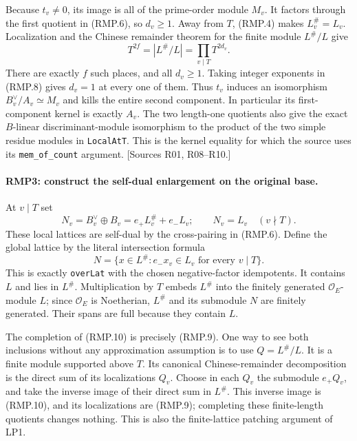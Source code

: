 Because $t_v\ne0$, its image is all of the prime-order module
$M_v$. It factors through the first quotient in (RMP.6), so $d_v\ge1$.
Away from $T$, (RMP.4) makes $L_v^{\#}=L_v$. Localization and the
Chinese remainder theorem for the finite module $L^{\#}/L$ give
\[
 T^{2f}=|L^{\#}/L|=\prod_{v\mid T}T^{2d_v}.
                                                               \tag{RMP.8}
\]
There are exactly $f$ such places, and all $d_v\ge1$. Taking
integer exponents in (RMP.8) gives $d_v=1$ at every one of them.
Thus $t_v$ induces an isomorphism
$B_v^{\vee}/A_v\simeq M_v$ and kills the entire second component.
In particular its first-component kernel is exactly $A_v$.
The two length-one quotients also give the exact $B$-linear
discriminant-module isomorphism to the product of the two simple
residue modules in \texttt{LocalAtT}.
This is the kernel equality for which the source uses its
\texttt{mem\_of\_count} argument. [Sources R01, R08--R10.]

\paragraph{RMP3: construct the self-dual enlargement on the original base.}
\label{claim:RMP3}
At $v\mid T$ set
\[
 N_v=B_v^{\vee}\oplus B_v
     =e_+L_v^{\#}+e_-L_v;
 \qquad N_v=L_v\quad(v\nmid T).                       \tag{RMP.9}
\]
These local lattices are self-dual by the cross-pairing in (RMP.6).
Define the global lattice by the literal intersection formula
\[
 N=\{x\in L^{\#}:e_-x_v\in L_v\text{ for every }v\mid T\}.
                                                               \tag{RMP.10}
\]
This is exactly \texttt{overLat} with the chosen negative-factor
idempotents. It contains $L$ and lies in $L^{\#}$. Multiplication by
$T$ embeds $L^{\#}$ into the finitely generated $\mathcal O_E$-module $L$;
since $\mathcal O_E$ is Noetherian, $L^{\#}$ and its submodule $N$
are finitely generated. Their spans are full because
they contain $L$.

The completion of (RMP.10) is precisely (RMP.9). One way to see both
inclusions without any approximation assumption is to use
$Q=L^{\#}/L$. It is a finite module supported above $T$.
Its canonical Chinese-remainder decomposition is the direct sum of
its localizations $Q_v$. Choose in each $Q_v$ the submodule
$e_+Q_v$, and take the inverse image of their direct sum in
$L^{\#}$. This inverse image is (RMP.10), and its localizations
are (RMP.9); completing these finite-length quotients changes
nothing. This is also the finite-lattice patching argument of LP1.

